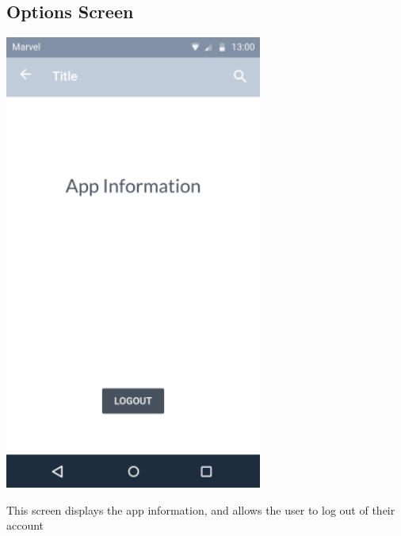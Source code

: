 \documentclass{report}
\begin{document}
\subsection{Options Screen}
\begin{center}
    \includegraphics[scale=0.6]{design-options}
\end{center}
This screen displays the app information, and allows the user to log out of their account

\newpage
\end{document}
